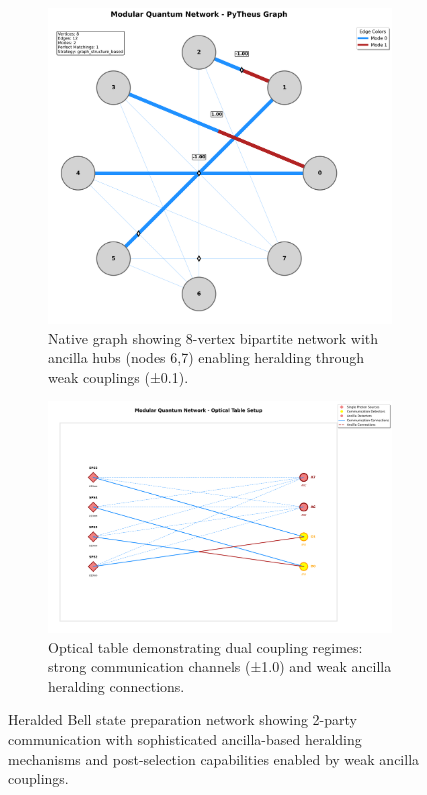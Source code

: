 \documentclass[11pt,a4paper]{article}
\begin{document}
\begin{figure}[htbp]
\centering
\begin{subfigure}{0.45\textwidth}
\includegraphics[width=\textwidth]{journal_heralded_bell_native_plot.png}
\caption{Native graph showing 8-vertex bipartite network with ancilla hubs (nodes 6,7) enabling heralding through weak couplings (±0.1).}
\end{subfigure}
\hfill
\begin{subfigure}{0.45\textwidth}
\includegraphics[width=\textwidth]{journal_heralded_bell_optical_table_setup.png}
\caption{Optical table demonstrating dual coupling regimes: strong communication channels (±1.0) and weak ancilla heralding connections.}
\end{subfigure}
\caption{Heralded Bell state preparation network showing 2-party communication with sophisticated ancilla-based heralding mechanisms and post-selection capabilities enabled by weak ancilla couplings.}
\label{fig:bell_analysis}
\end{figure}
\end{document}
